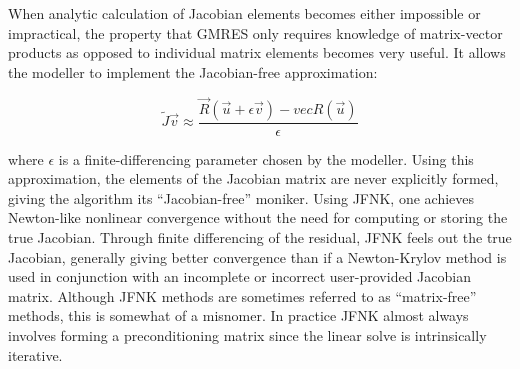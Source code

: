 When analytic calculation of Jacobian elements becomes either impossible or impractical, the property that GMRES only requires knowledge of matrix-vector products as opposed to individual matrix elements becomes very useful. It allows the modeller to implement the Jacobian-free approximation: \cite{knoll2004jacobian}

\begin{equation}
  \tilde{J}\vec{v} \approx \frac{\vec{R}(\vec{u}+\epsilon\vec{v})-vec{R}(\vec{u})}{\epsilon}
  \label{eq:jacob_free}
\end{equation}

where $\epsilon$ is a finite-differencing parameter chosen by the modeller. Using this approximation, the elements of the Jacobian matrix are never explicitly formed, giving the algorithm its ``Jacobian-free'' moniker. Using JFNK, one achieves Newton-like nonlinear convergence without the need for computing or storing the true Jacobian. \cite{knoll2004jacobian} Through finite differencing of the residual, JFNK feels out the true Jacobian, generally giving better convergence than if a Newton-Krylov method is used in conjunction with an incomplete or incorrect user-provided Jacobian matrix. Although JFNK methods are sometimes referred to as ``matrix-free'' methods, this is somewhat of a misnomer. In practice JFNK almost always involves forming a preconditioning matrix since the linear solve is intrinsically iterative.

